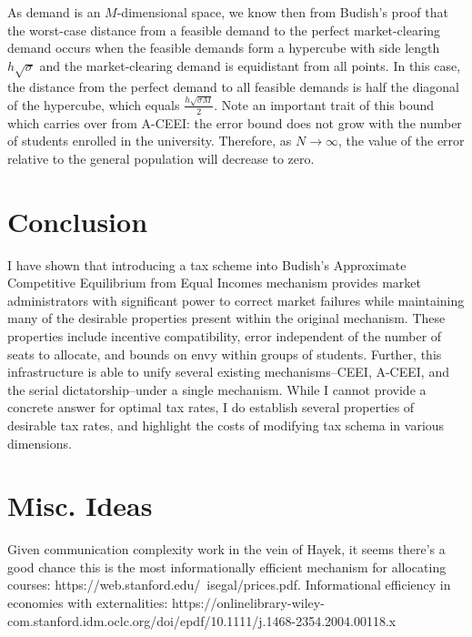 \documentclass{article}
\begin{document}
As demand is an $M$-dimensional space, we know then from Budish's proof that the worst-case distance from a feasible demand to the perfect market-clearing demand occurs when the feasible demands form a hypercube with side length $h\sqrt{\sigma}$ and the market-clearing demand is equidistant from all points. In this case, the distance from the perfect demand to all feasible demands is half the diagonal of the hypercube, which equals $\frac{h\sqrt{\sigma M}}{2}$. Note an important trait of this bound which carries over from A-CEEI: the error bound does not grow with the number of students enrolled in the university. Therefore, as $N \rightarrow \infty$, the value of the error relative to the general population will decrease to zero. 

\section{Conclusion}

I have shown that introducing a tax scheme into Budish's Approximate Competitive Equilibrium from Equal Incomes mechanism provides market administrators with significant power to correct market failures while maintaining many of the desirable properties present within the original mechanism. These properties include incentive compatibility, error independent of the number of seats to allocate, and bounds on envy within groups of students. Further, this infrastructure is able to unify several existing mechanisms--CEEI, A-CEEI, and the serial dictatorship--under a single mechanism. While I cannot provide a concrete answer for optimal tax rates, I do establish several properties of desirable tax rates, and highlight the costs of modifying tax schema in various dimensions. 



\printbibliography

\pagebreak

\section{Misc. Ideas}

Given communication complexity work in the vein of Hayek, it seems there's a good chance this is the most informationally efficient mechanism for allocating courses: https://web.stanford.edu/~isegal/prices.pdf. Informational efficiency in economies with externalities: https://onlinelibrary-wiley-com.stanford.idm.oclc.org/doi/epdf/10.1111/j.1468-2354.2004.00118.x
\end{document}
